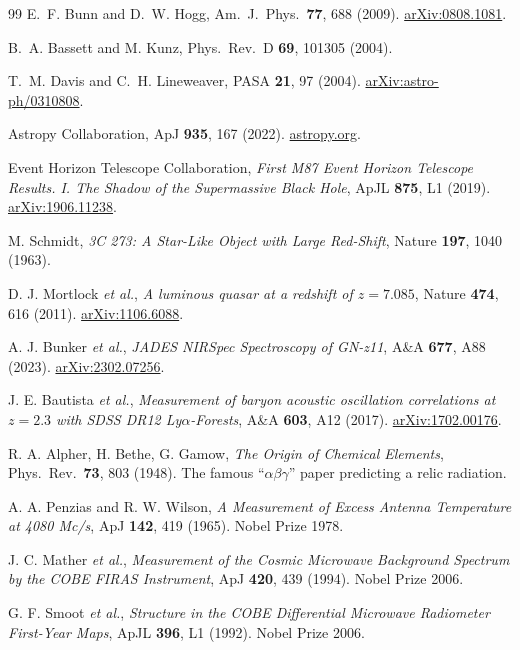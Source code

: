 \documentclass[11pt,a4paper,openany]{report}
\begin{document}
\begin{thebibliography}{99}
E.~F. Bunn and D.~W. Hogg,
Am.\ J.\ Phys.\ \textbf{77}, 688 (2009).
\href{https://arxiv.org/abs/0808.1081}{arXiv:0808.1081}.

B.~A. Bassett and M. Kunz, Phys.\ Rev.\ D \textbf{69}, 101305 (2004).

T.~M. Davis and C.~H. Lineweaver, PASA \textbf{21}, 97 (2004).
\href{https://arxiv.org/abs/astro-ph/0310808}{arXiv:astro-ph/0310808}.

Astropy Collaboration, ApJ \textbf{935}, 167 (2022).
\href{https://www.astropy.org}{astropy.org}.

Event Horizon Telescope Collaboration,
\textit{First M87 Event Horizon Telescope Results. I. The Shadow of the
Supermassive Black Hole}, ApJL \textbf{875}, L1 (2019).
\href{https://arxiv.org/abs/1906.11238}{arXiv:1906.11238}.

M. Schmidt,
\textit{3C 273: A Star-Like Object with Large Red-Shift},
Nature \textbf{197}, 1040 (1963).

D. J. Mortlock \emph{et al.},
\textit{A luminous quasar at a redshift of $z=7.085$},
Nature \textbf{474}, 616 (2011).
\href{https://arxiv.org/abs/1106.6088}{arXiv:1106.6088}.

A. J. Bunker \emph{et al.},
\textit{JADES NIRSpec Spectroscopy of GN-z11},
A\&A \textbf{677}, A88 (2023).
\href{https://arxiv.org/abs/2302.07256}{arXiv:2302.07256}.

J. E. Bautista \emph{et al.},
\textit{Measurement of baryon acoustic oscillation correlations at $z = 2.3$
with SDSS DR12 Ly$\alpha$-Forests},
A\&A \textbf{603}, A12 (2017).
\href{https://arxiv.org/abs/1702.00176}{arXiv:1702.00176}.

R. A. Alpher, H. Bethe, G. Gamow,
\textit{The Origin of Chemical Elements},
Phys.\ Rev.\ \textbf{73}, 803 (1948).
The famous “$\alpha\beta\gamma$” paper predicting a relic radiation.

A. A. Penzias and R. W. Wilson,
\textit{A Measurement of Excess Antenna Temperature at 4080 Mc/s},
ApJ \textbf{142}, 419 (1965). Nobel Prize 1978.

J. C. Mather \emph{et al.},
\textit{Measurement of the Cosmic Microwave Background Spectrum by the COBE
FIRAS Instrument}, ApJ \textbf{420}, 439 (1994). Nobel Prize 2006.

G. F. Smoot \emph{et al.},
\textit{Structure in the COBE Differential Microwave Radiometer First-Year
Maps}, ApJL \textbf{396}, L1 (1992). Nobel Prize 2006.

\end{thebibliography}
\end{document}
